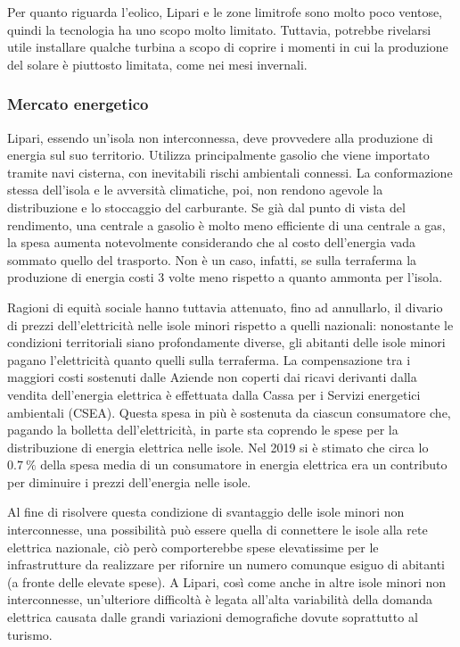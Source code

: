 \documentclass[fleqn,11pt]{SelfArx} %
\begin{document}
Per quanto riguarda l'eolico, Lipari e le zone limitrofe sono molto poco ventose, quindi la tecnologia ha uno scopo molto limitato. 
Tuttavia, potrebbe rivelarsi utile installare qualche turbina a scopo di coprire i momenti in cui la produzione del solare è piuttosto limitata, come nei mesi invernali.

\subsubsection{Mercato energetico}
Lipari, essendo un'isola non interconnessa, deve provvedere alla produzione di energia sul suo territorio. Utilizza principalmente gasolio che viene importato tramite navi cisterna, con inevitabili rischi ambientali connessi. La conformazione stessa dell'isola e le avversità climatiche, poi, non rendono agevole la distribuzione e lo stoccaggio del carburante. Se già dal punto di vista del rendimento, una centrale a gasolio è molto meno efficiente di una centrale a gas, la spesa aumenta notevolmente considerando che al costo dell'energia vada sommato quello del trasporto. Non è un caso, infatti, se sulla terraferma la produzione di energia costi 3 volte meno rispetto a quanto ammonta per l'isola. 

Ragioni di equità sociale hanno tuttavia attenuato, fino ad annullarlo, il divario di prezzi dell'elettricità nelle isole minori rispetto a quelli nazionali: nonostante le condizioni territoriali siano profondamente diverse, gli abitanti delle isole minori pagano l'elettricità quanto quelli sulla terraferma. La compensazione tra i maggiori costi sostenuti dalle Aziende non coperti dai ricavi derivanti dalla vendita dell'energia elettrica è effettuata dalla Cassa per i Servizi energetici ambientali (CSEA). Questa spesa in più è sostenuta da ciascun consumatore che, pagando la bolletta dell'elettricità, in parte sta coprendo le spese per la distribuzione di energia elettrica nelle isole. Nel 2019 si è stimato che circa lo \(\SI{0.7}{\percent}\) della spesa media di un consumatore in energia elettrica era un contributo per diminuire i prezzi dell'energia nelle isole. 

Al fine di risolvere questa condizione di svantaggio delle isole minori non interconnesse, una possibilità può essere quella di connettere le isole alla rete elettrica nazionale, ciò però comporterebbe spese elevatissime per le infrastrutture da realizzare per rifornire un numero comunque esiguo di abitanti (a fronte delle elevate spese). A Lipari, così come anche in altre isole minori non interconnesse, un'ulteriore difficoltà è legata all'alta variabilità della domanda elettrica causata dalle grandi variazioni demografiche dovute soprattutto al turismo. 
\end{document}
